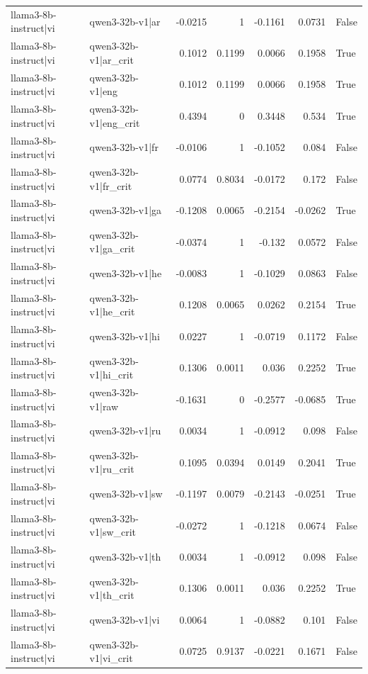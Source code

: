 \begin{table}
\begin{tabular}{l l r r r r l}
llama3-8b-instruct|vi & qwen3-32b-v1|ar & -0.0215 & 1 & -0.1161 & 0.0731 & False \\
llama3-8b-instruct|vi & qwen3-32b-v1|ar_crit & 0.1012 & 0.1199 & 0.0066 & 0.1958 & True \\
llama3-8b-instruct|vi & qwen3-32b-v1|eng & 0.1012 & 0.1199 & 0.0066 & 0.1958 & True \\
llama3-8b-instruct|vi & qwen3-32b-v1|eng_crit & 0.4394 & 0 & 0.3448 & 0.534 & True \\
llama3-8b-instruct|vi & qwen3-32b-v1|fr & -0.0106 & 1 & -0.1052 & 0.084 & False \\
llama3-8b-instruct|vi & qwen3-32b-v1|fr_crit & 0.0774 & 0.8034 & -0.0172 & 0.172 & False \\
llama3-8b-instruct|vi & qwen3-32b-v1|ga & -0.1208 & 0.0065 & -0.2154 & -0.0262 & True \\
llama3-8b-instruct|vi & qwen3-32b-v1|ga_crit & -0.0374 & 1 & -0.132 & 0.0572 & False \\
llama3-8b-instruct|vi & qwen3-32b-v1|he & -0.0083 & 1 & -0.1029 & 0.0863 & False \\
llama3-8b-instruct|vi & qwen3-32b-v1|he_crit & 0.1208 & 0.0065 & 0.0262 & 0.2154 & True \\
llama3-8b-instruct|vi & qwen3-32b-v1|hi & 0.0227 & 1 & -0.0719 & 0.1172 & False \\
llama3-8b-instruct|vi & qwen3-32b-v1|hi_crit & 0.1306 & 0.0011 & 0.036 & 0.2252 & True \\
llama3-8b-instruct|vi & qwen3-32b-v1|raw & -0.1631 & 0 & -0.2577 & -0.0685 & True \\
llama3-8b-instruct|vi & qwen3-32b-v1|ru & 0.0034 & 1 & -0.0912 & 0.098 & False \\
llama3-8b-instruct|vi & qwen3-32b-v1|ru_crit & 0.1095 & 0.0394 & 0.0149 & 0.2041 & True \\
llama3-8b-instruct|vi & qwen3-32b-v1|sw & -0.1197 & 0.0079 & -0.2143 & -0.0251 & True \\
llama3-8b-instruct|vi & qwen3-32b-v1|sw_crit & -0.0272 & 1 & -0.1218 & 0.0674 & False \\
llama3-8b-instruct|vi & qwen3-32b-v1|th & 0.0034 & 1 & -0.0912 & 0.098 & False \\
llama3-8b-instruct|vi & qwen3-32b-v1|th_crit & 0.1306 & 0.0011 & 0.036 & 0.2252 & True \\
llama3-8b-instruct|vi & qwen3-32b-v1|vi & 0.0064 & 1 & -0.0882 & 0.101 & False \\
llama3-8b-instruct|vi & qwen3-32b-v1|vi_crit & 0.0725 & 0.9137 & -0.0221 & 0.1671 & False \\

\end{tabular}
\end{table}
